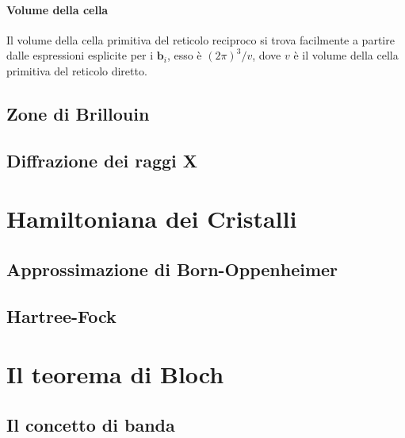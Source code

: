 \paragraph{Volume della cella} Il volume della cella primitiva del reticolo reciproco si trova facilmente a partire dalle espressioni esplicite per i $ \textbf{b}_i $, esso è $ (2\pi)^3/v $, dove $ v $ è il volume della cella primitiva del reticolo diretto.


\subsection{Zone di Brillouin}

\subsection{Diffrazione dei raggi X}

\section{Hamiltoniana dei Cristalli}

\subsection{Approssimazione di Born-Oppenheimer}

\subsection{Hartree-Fock}

\section{Il teorema di Bloch}

\subsection{Il concetto di banda}